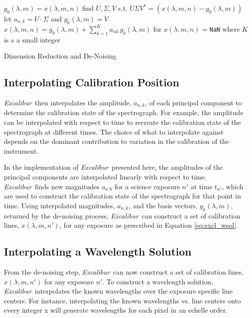 \documentclass[modern]{aastex63}
\newcommand{\project}[1]{\textsl{#1}}
\newcommand{\name}{\project{Excalibur}}
\newcommand{\code}[1]{\texttt{#1}}
\begin{document}
\begin{algorithm}
\SetAlgoLined
{}
{
	$g_0(\lambda,m) = \overline{x(\lambda,m,n)}$\;
	find $U, \Sigma, V$ s.t. $U\Sigma V^* = (x(\lambda,m,n)-g_0(\lambda,m))$\;
	let $a_{n,k} = U\cdot \Sigma$ and $g_k(\lambda,m) = V$\;
	$x(\lambda,m,n) = g_0(\lambda,m) + \sum_{k=1}^K a_{nk}\,g_k(\lambda,m)$ for $x(\lambda,m,n)$ = \code{NaN} where $K$ is a a small integer
	}
\caption{Dimension Reduction and De-Noising}
\end{algorithm}

\subsection{Interpolating Calibration Position}
 \label{sec:interp_time}
\name\ then interpolates the amplitude, $a_{n,k}$, of each principal component to determine the calibration state of the spectrograph.  For example, the amplitude can be interpolated with respect to time to recreate the calibration state of the spectrograph at different times.  The choice of what to interpolate against depends on the dominant contribution to variation in the calibration of the instrument.

In the implementation of \name\ presented here, the amplitudes of the principal components are interpolated linearly with respect to time.  \name\ finds new magnitudes $a_{n'k}$ for a science exposure $n'$ at time $t_{n'}$, which are used to construct the calibration state of the spectrograph for that point in time.  Using interpolated magnitudes, $a_{n,k}$, and the basis vectors, $g_k(\lambda,m)$, returned by the de-noising process, \name\ can construct a set of calibration lines, $x(\lambda,m,n') $, for any exposure as prescribed in Equation \ref{eq:excl_wsol}.


\subsection{Interpolating a Wavelength Solution} \label{sec:interp_wsol}
From the de-noising step, \name\ can now construct a set of calibration lines, $x(\lambda,m,n')$ for any exposure $n'$.  To construct a wavelength solution, \name\ interpolates the known wavelengths over the exposure specific line centers.  For instance, interpolating the known wavelengths vs. line centers onto every integer x will generate wavelengths for each pixel in an echelle order.
\end{document}
